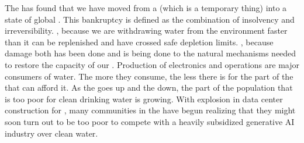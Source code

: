 The  has found that we have moved from a  (which is a temporary thing) into a state of global \cite{WaterBankruptcy26}. This bankruptcy is defined as the combination of insolvency and irreversibility. , because we are withdrawing water from the environment faster than it can be replenished and have crossed safe depletion limits. , because damage both has been done and is being done to the natural mechanisms needed to restore the capacity of our . Production of electronics and  operations are major consumers of water. The more they consume, the less there is for the part of the  that can afford it. As the  goes up and the  down, the part of the population that is too poor for clean drinking water is growing. With explosion in data center construction for , many communities in the  have begun realizing that they might soon turn out to be too poor to compete with a heavily subsidized generative AI industry over clean water.

